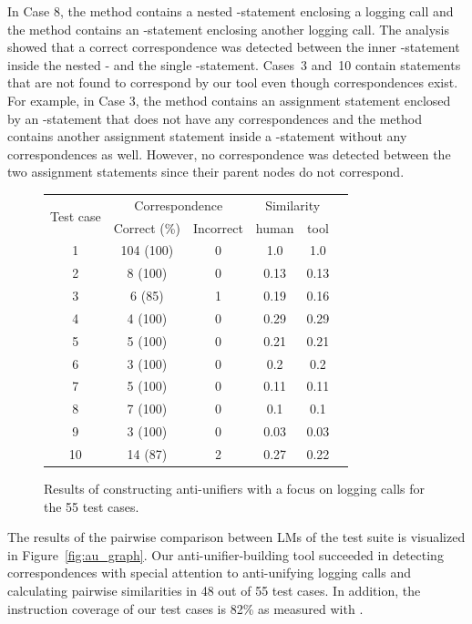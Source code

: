 In Case 8, the  method contains a nested -statement enclosing a logging call and the  method contains an -statement enclosing another logging call. The analysis showed that a correct correspondence was detected between the inner -statement inside the nested - and the single -statement. Cases~3 and~10 contain statements that are not found to correspond by our tool even though correspondences exist. For example, in Case 3, the  method contains an assignment statement enclosed by an -statement that does not have any correspondences and the  method contains another assignment statement inside a -statement without any correspondences as well. However, no correspondence was detected between the two assignment statements since their parent nodes do not correspond.
\begin{figure}
  \centering
  \begin{tabular}{cccccc}
    \toprule
    \multirow{2}{*}{Test case}&\multicolumn{2}{c}{Correspondence}&\multicolumn{2}{c}{Similarity}\\
    \cmidrule(lr){2-3}
    \cmidrule(lr){4-5}
    &Correct (\%)&Incorrect&human&tool\\
    \midrule
    1&104 (100)&0& 1.0 & 1.0\\
    \midrule
    2&8 (100)&0& 0.13& 0.13\\
    \midrule
    3&6 (85)&1&0.19& 0.16\\
    \midrule
    4&4 (100)&0&0.29 &0.29\\
    \midrule
    5&5 (100)&0&0.21 &0.21\\
    \midrule
    6&3 (100)&0&0.2 &0.2\\
    \midrule
    7&5 (100)&0&0.11 &0.11\\
    \midrule
    8&7 (100)&0& 0.1&0.1\\
    \midrule
    9&3 (100)&0&0.03&0.03 \\
    \midrule
    10&14 (87)&2&0.27 &0.22\\
    \bottomrule
  \end{tabular}
  \caption{Results of constructing anti-unifiers with a focus on logging calls for the 55 test cases.}
  \label{study2_test_cases_results}
\end{figure}

The results of the pairwise comparison between LMs of the test suite is visualized in Figure~\ref{fig:au_graph}. Our anti-unifier-building tool succeeded in detecting correspondences with special attention to anti-unifying logging calls and calculating pairwise similarities in 48 out of 55 test cases. In addition, the instruction coverage of our test cases is 82\% as measured with .

